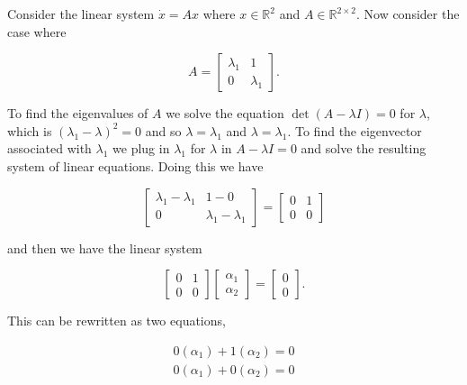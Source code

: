 \documentclass[12pt]{article}
\theoremstyle{definition}
\begin{document}
Consider the linear system $\dot x = Ax$ where $x \in \mathbb{R}^2$ and $A \in \mathbb{R}^{2 \times 2}$. Now consider the case where 

\begin{equation*}
A =
\begin{bmatrix}
\lambda_1 & 1 \\
0 & \lambda_1
\end{bmatrix}
.
\end{equation*}

To find the eigenvalues of $A$ we solve the equation $\det (A - \lambda I) = 0$ for $\lambda$, which is $(\lambda_1 - \lambda)^2 = 0$ and so $\lambda = \lambda_1$ and $\lambda = \lambda_1$. To find the eigenvector associated with $\lambda_1$ we plug in $\lambda_1$ for $\lambda$ in $A - \lambda I = 0$ and solve the resulting system of linear equations. Doing this we have

\begin{equation*}
\begin{bmatrix}
\lambda_1 - \lambda_1 & 1 - 0 \\
0 & \lambda_1 - \lambda_1
\end{bmatrix}
=
\begin{bmatrix}
0 & 1 \\
0 & 0 
\end{bmatrix}
\end{equation*} 

and then we have the linear system

\begin{equation*}
\begin{bmatrix}
0 & 1 \\
0 & 0
\end{bmatrix}
\begin{bmatrix}
\alpha_1 \\
\alpha_2
\end{bmatrix}
=
\begin{bmatrix}
0 \\
0
\end{bmatrix}
.
\end{equation*}

This can be rewritten as two equations,

\begin{equation*}
\begin{split}
0(\alpha_1) + 1(\alpha_2) = 0 \\
0(\alpha_1) + 0(\alpha_2) = 0 
\end{split}
\end{equation*}
\end{document}

